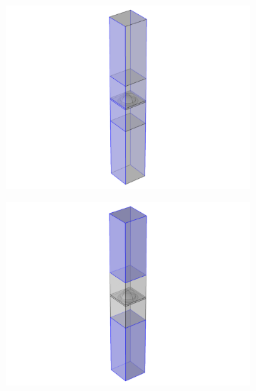 \begin{figure}[htb]
\begin{subfigure}{0.19\textwidth}
        \centering
        \includegraphics[width=\linewidth, trim=4.2cm 0 4.2cm 0, clip]{figures/ch4/implem/ewfd/ewfd_pc2.png}
        \caption{}
        \label{fig:implementation_ewfd_pc2}
    \end{subfigure}
    \begin{subfigure}{0.19\textwidth}
        \centering
        \includegraphics[width=\linewidth, trim=4.2cm 0 4.2cm 0, clip]{figures/ch4/implem/ewfd/ewfd_pml.png}
        \caption{}
        \label{fig:implementation_ewfd_pml}
    \end{subfigure}
    \begin{subfigure}{0.19\textwidth}
        \centering

\end{subfigure}
\end{figure}
